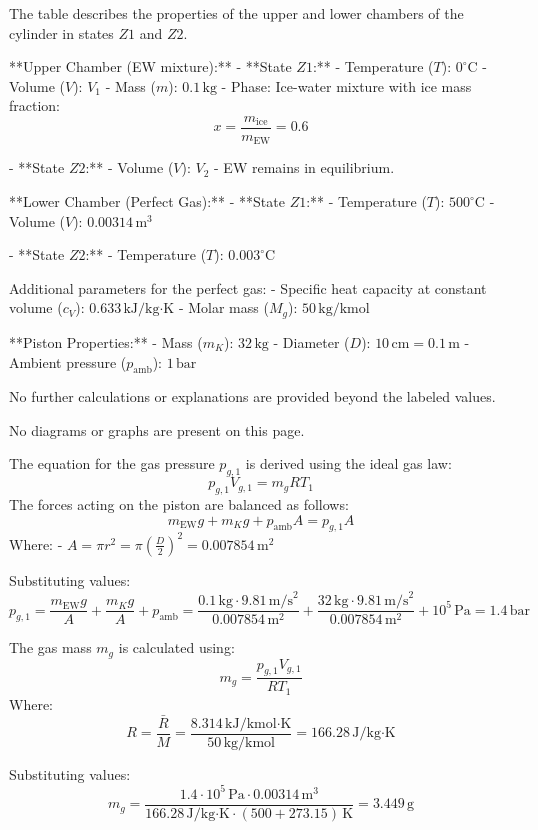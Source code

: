 The table describes the properties of the upper and lower chambers of the cylinder in states \( Z1 \) and \( Z2 \).  

**Upper Chamber (EW mixture):**  
- **State \( Z1 \):**  
  - Temperature (\( T \)): \( 0^\circ\text{C} \)  
  - Volume (\( V \)): \( V_1 \)  
  - Mass (\( m \)): \( 0.1 \, \text{kg} \)  
  - Phase: Ice-water mixture with ice mass fraction:  
    \[
    x = \frac{m_{\text{ice}}}{m_{\text{EW}}} = 0.6
    \]  

- **State \( Z2 \):**  
  - Volume (\( V \)): \( V_2 \)  
  - EW remains in equilibrium.  

**Lower Chamber (Perfect Gas):**  
- **State \( Z1 \):**  
  - Temperature (\( T \)): \( 500^\circ\text{C} \)  
  - Volume (\( V \)): \( 0.00314 \, \text{m}^3 \)  

- **State \( Z2 \):**  
  - Temperature (\( T \)): \( 0.003^\circ\text{C} \)  

Additional parameters for the perfect gas:  
- Specific heat capacity at constant volume (\( c_V \)): \( 0.633 \, \text{kJ/kg·K} \)  
- Molar mass (\( M_g \)): \( 50 \, \text{kg/kmol} \)  

**Piston Properties:**  
- Mass (\( m_K \)): \( 32 \, \text{kg} \)  
- Diameter (\( D \)): \( 10 \, \text{cm} = 0.1 \, \text{m} \)  
- Ambient pressure (\( p_{\text{amb}} \)): \( 1 \, \text{bar} \)  

No further calculations or explanations are provided beyond the labeled values.  

No diagrams or graphs are present on this page.

The equation for the gas pressure \( p_{g,1} \) is derived using the ideal gas law:  
\[
p_{g,1} V_{g,1} = m_g R T_1
\]  
The forces acting on the piston are balanced as follows:  
\[
m_{\text{EW}} g + m_K g + p_{\text{amb}} A = p_{g,1} A
\]  
Where:  
- \( A = \pi r^2 = \pi \left( \frac{D}{2} \right)^2 = 0.007854 \, \text{m}^2 \)  

Substituting values:  
\[
p_{g,1} = \frac{m_{\text{EW}} g}{A} + \frac{m_K g}{A} + p_{\text{amb}} = \frac{0.1 \, \text{kg} \cdot 9.81 \, \text{m/s}^2}{0.007854 \, \text{m}^2} + \frac{32 \, \text{kg} \cdot 9.81 \, \text{m/s}^2}{0.007854 \, \text{m}^2} + 10^5 \, \text{Pa} = 1.4 \, \text{bar}
\]  

The gas mass \( m_g \) is calculated using:  
\[
m_g = \frac{p_{g,1} V_{g,1}}{R T_1}
\]  
Where:  
\[
R = \frac{\bar{R}}{M} = \frac{8.314 \, \text{kJ/kmol·K}}{50 \, \text{kg/kmol}} = 166.28 \, \text{J/kg·K}
\]  

Substituting values:  
\[
m_g = \frac{1.4 \cdot 10^5 \, \text{Pa} \cdot 0.00314 \, \text{m}^3}{166.28 \, \text{J/kg·K} \cdot (500 + 273.15) \, \text{K}} = 3.449 \, \text{g}
\]